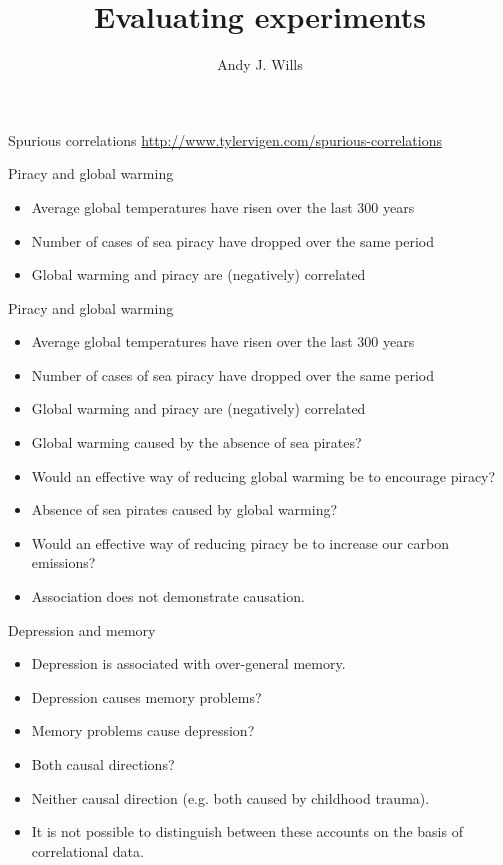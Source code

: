 \documentclass{beamer}
\title[Critical Thinking]{Evaluating experiments}
\author{Andy J. Wills}
\date{}
\begin{document}
\frame{\titlepage}

\begin{frame}{Spurious correlations}
	\url{http://www.tylervigen.com/spurious-correlations}
\end{frame}

\begin{frame}{Piracy and global warming}
\begin{itemize}
\item Average global temperatures have risen over the last 300 years
\item Number of cases of sea piracy have dropped over the same period
\item Global warming and piracy are (negatively) correlated
\vspace{12 pt}
\end{itemize}
\end{frame}

\begin{frame}{Piracy and global warming}
\begin{itemize}
\item Average global temperatures have risen over the last 300 years
\item Number of cases of sea piracy have dropped over the same period
\item Global warming and piracy are (negatively) correlated
\vspace{12 pt}
\item Global warming caused by the absence of sea pirates? 
\item Would an effective way of reducing global warming be to encourage piracy?
\vspace{12 pt}
\item Absence of sea pirates caused by global warming? 
\item Would an effective way of reducing piracy be to increase our carbon emissions?
\vspace{12 pt}
\item Association does not demonstrate causation. 
\end{itemize}
\end{frame}

\begin{frame}{Depression and memory}
\begin{itemize}
\item Depression is associated with over-general memory.
\vspace{12 pt}
\item Depression causes memory problems? 
\item Memory problems cause depression?
\item Both causal directions?
\item Neither causal direction (e.g. both caused by childhood trauma). 
\vspace{12 pt}
\item It is not possible to distinguish between these accounts on the basis of correlational data.
\end{itemize}
\end{frame}
\end{document}
